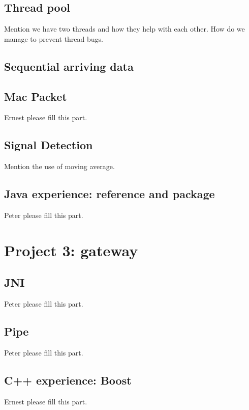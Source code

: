 \documentclass[conference,compsoc]{IEEEtran}
\begin{document}
	\subsection{Thread pool}
		Mention we have two threads and how they help with each other.
		How do we manage to prevent thread bugs.
	
	\subsection{Sequential arriving data}
	
	\subsection{Mac Packet}
		Ernest please fill this part.
	
	\subsection{Signal Detection}
		Mention the use of moving average.
	
	\subsection{Java experience: reference and package}
		Peter please fill this part.

\section{Project 3: gateway}
	
	\subsection{JNI}
		Peter please fill this part.
	
	\subsection{Pipe}
		Peter please fill this part.
	
	\subsection{C++ experience: Boost}
		Ernest please fill this part.

\end{document}
